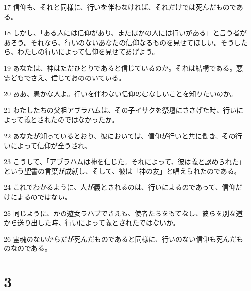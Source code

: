 \par 17 信仰も、それと同様に、行いを伴わなければ、それだけでは死んだものである。
\par 18 しかし、「ある人には信仰があり、またほかの人には行いがある」と言う者があろう。それなら、行いのないあなたの信仰なるものを見せてほしい。そうしたら、わたしの行いによって信仰を見せてあげよう。
\par 19 あなたは、神はただひとりであると信じているのか。それは結構である。悪霊どもでさえ、信じておののいている。
\par 20 ああ、愚かな人よ。行いを伴わない信仰のむなしいことを知りたいのか。
\par 21 わたしたちの父祖アブラハムは、その子イサクを祭壇にささげた時、行いによって義とされたのではなかったか。
\par 22 あなたが知っているとおり、彼においては、信仰が行いと共に働き、その行いによって信仰が全うされ、
\par 23 こうして、「アブラハムは神を信じた。それによって、彼は義と認められた」という聖書の言葉が成就し、そして、彼は「神の友」と唱えられたのである。
\par 24 これでわかるように、人が義とされるのは、行いによるのであって、信仰だけによるのではない。
\par 25 同じように、かの遊女ラハブでさえも、使者たちをもてなし、彼らを別な道から送り出した時、行いによって義とされたではないか。
\par 26 霊魂のないからだが死んだものであると同様に、行いのない信仰も死んだものなのである。

\chapter{3}

